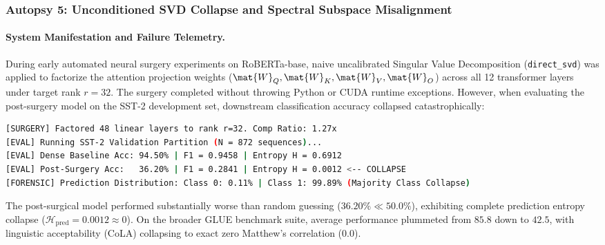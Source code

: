 \subsubsection{Autopsy 5: Unconditioned SVD Collapse and Spectral Subspace Misalignment}
\label{sec:autopsy_unconditioned_svd}

\paragraph{System Manifestation and Failure Telemetry.}
During early automated neural surgery experiments on RoBERTa-base, naive uncalibrated Singular Value Decomposition (\texttt{direct\_svd}) was applied to factorize the attention projection weights ($\mat{W}_Q, \mat{W}_K, \mat{W}_V, \mat{W}_O$) across all 12 transformer layers under target rank $r=32$. The surgery completed without throwing Python or CUDA runtime exceptions. However, when evaluating the post-surgery model on the SST-2 development set, downstream classification accuracy collapsed catastrophically:
\begin{lstlisting}[language=bash]
[SURGERY] Factored 48 linear layers to rank r=32. Comp Ratio: 1.27x
[EVAL] Running SST-2 Validation Partition (N = 872 sequences)...
[EVAL] Dense Baseline Acc: 94.50% | F1 = 0.9458 | Entropy H = 0.6912
[EVAL] Post-Surgery Acc:   36.20% | F1 = 0.2841 | Entropy H = 0.0012 <-- COLLAPSE
[FORENSIC] Prediction Distribution: Class 0: 0.11% | Class 1: 99.89% (Majority Class Collapse)
\end{lstlisting}
The post-surgical model performed substantially worse than random guessing ($36.20\% \ll 50.0\%$), exhibiting complete prediction entropy collapse ($\mathcal{H}_{\text{pred}} = 0.0012 \approx 0$). On the broader GLUE benchmark suite, average performance plummeted from $85.8$ down to $42.5$, with linguistic acceptability (CoLA) collapsing to exact zero Matthew's correlation ($0.0$).

